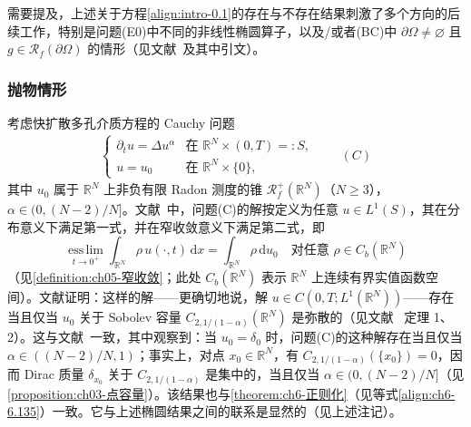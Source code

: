 \documentclass[../main.tex]{subfiles}
\begin{document}
需要提及，上述关于方程\eqref{align:intro-0.1}的存在与不存在结果刺激了多个方向的后续工作，特别是问题(E0)中不同的非线性椭圆算子，以及/或者(BC)中 $\partial\Omega\neq\varnothing $ 且 $g\in\mathscr{R}_f(\partial\Omega)$ 的情形（见文献~\cite{ref14,ref13,ref37,ref55,ref69,ref106}及其中引文）。

\subsubsection*{抛物情形}\label{subsubsection:intro-parabolic}

考虑快扩散多孔介质方程的 Cauchy 问题
\begin{align*}
\begin{cases}
\partial_t u = \Delta u^\alpha & \text{在 }\mathbb{R}^N\times(0,T)=:S,\\
u=u_0 & \text{在 }\mathbb{R}^N\times\{0\},
\end{cases}
\qquad(C)
\end{align*}
其中 $u_0$ 属于 $\mathbb{R}^N$ 上非负有限 Radon 测度的锥 $\mathscr{R}^+_f(\mathbb{R}^N)$（$N\geqslant 3$），$\alpha\in(0,(N-2)/N]$。文献~\cite{ref80}中，问题(C)的解按定义为任意 $u\in L^1(S)$，其在分布意义下满足第一式，并在窄收敛意义下满足第二式，即
\[
\operatorname*{ess\,lim}_{t\to 0^+}\int_{\mathbb{R}^N}\rho\,u(\cdot,t)\,\mathrm{d}x
= \int_{\mathbb{R}^N}\rho\,\mathrm{d}u_0
\quad \text{对任意 }\rho\in C_b(\mathbb{R}^N)
\]
（见\cref{definition:ch05-窄收敛}；此处 $C_b(\mathbb{R}^N)$ 表示 $\mathbb{R}^N$ 上连续有界实值函数空间）。文献证明：这样的解——更确切地说，解 $u\in C(0,T;L^1(\mathbb{R}^N))$——存在当且仅当 $u_0$ 关于 Sobolev 容量 $C_{2,1/(1-\alpha)}(\mathbb{R}^N)$ 是弥散的（见文献~\cite{ref80} 定理 1、2）。这与文献~\cite{ref26}一致，其中观察到：当 $u_0=\delta_0$ 时，问题(C)的这种解存在当且仅当 $\alpha\in((N-2)/N,1)$；事实上，对点 $x_0\in\mathbb{R}^N$，有 $C_{2,1/(1-\alpha)}(\{x_0\})=0$，因而 Dirac 质量 $\delta_{x_0}$ 关于 $C_{2,1/(1-\alpha)}$ 是集中的，当且仅当 $\alpha\in(0,(N-2)/N]$（见\cref{proposition:ch03-点容量}）。该结果也与\cref{theorem:ch6-正则化}（见等式\eqref{align:ch6-6.135}）一致。它与上述椭圆结果之间的联系是显然的（见上述注记）。
\end{document}

